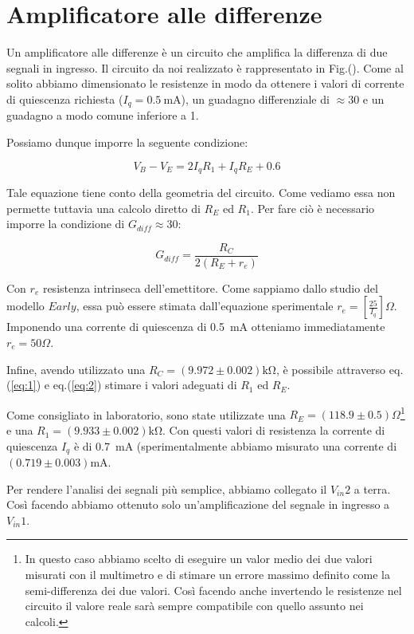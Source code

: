 \section{Amplificatore alle differenze}
Un amplificatore alle differenze è un circuito che amplifica la differenza di due segnali in ingresso. 
Il circuito da noi realizzato è rappresentato in Fig.().
Come al solito abbiamo dimensionato le resistenze in modo da ottenere i valori di corrente di quiescenza richiesta ($I_q=\SI{0.5}{\milli\ampere}$), un guadagno differenziale di $\approx 30$ e un guadagno a modo comune inferiore a 1.

Possiamo dunque imporre la seguente condizione:

\begin{equation}
V_B-V_E=2I_q R_1 + I_q R_E + 0.6
\label{eq:1}
\end{equation}

Tale equazione tiene conto della geometria del circuito. Come vediamo essa non permette tuttavia una calcolo diretto di $R_E$ ed $R_1$. Per fare ciò è necessario imporre la condizione di $G_{diff} \approx 30$:

\begin{equation}
G_{diff}=\frac{R_C}{2(R_E+r_e)}
\label{eq:2}
\end{equation}

Con $r_e$ resistenza intrinseca dell'emettitore. Come sappiamo dallo studio del modello $Early$, essa può essere stimata dall'equazione sperimentale $r_e = [\frac{25}{I_q}] \Omega$. Imponendo una corrente di quiescenza di \SI{0.5}{\milli\ampere} otteniamo immediatamente $r_e=50 \Omega$. 

Infine, avendo utilizzato una $R_C=(9.972\pm0.002)\si{\kilo\ohm}$, è possibile attraverso eq.(\ref{eq:1}) e eq.(\ref{eq:2}) stimare i valori adeguati di $R_1$ ed $R_E$. 

Come consigliato in laboratorio, sono state utilizzate una $R_E=(118.9\pm0.5) \Omega$\footnote{In questo caso abbiamo scelto di eseguire un valor medio dei due valori misurati con il multimetro e di stimare un errore massimo definito come la semi-differenza dei due valori. Così facendo anche invertendo le resistenze nel circuito il valore reale sarà sempre compatibile con quello assunto nei calcoli.} e una $R_1= (9.933 \pm 0.002)\si{\kilo\ohm}$.
Con questi valori di resistenza la corrente di quiescenza $I_q$ è di \SI{0.7}{\milli\ampere} (sperimentalmente abbiamo misurato una corrente di $(0.719 \pm 0.003) \si{\milli\ampere}$.

Per rendere l'analisi dei segnali più semplice, abbiamo collegato il $V_{in}2$ a terra.
Così facendo abbiamo ottenuto solo un'amplificazione del segnale in ingresso a $V_{in}1$. 

